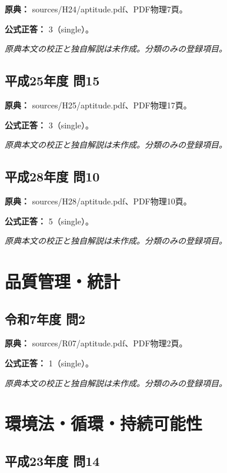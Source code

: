 \noindent\textbf{原典：} sources/H24/aptitude.pdf、PDF物理7頁。

\textbf{公式正答：} 3（single）。

\par\textit{原典本文の校正と独自解説は未作成。分類のみの登録項目。}

\subsection{平成25年度 問15}
\label{q:h25-reg-apt-15}

\noindent\textbf{原典：} sources/H25/aptitude.pdf、PDF物理17頁。

\textbf{公式正答：} 3（single）。

\par\textit{原典本文の校正と独自解説は未作成。分類のみの登録項目。}

\subsection{平成28年度 問10}
\label{q:h28-reg-apt-10}

\noindent\textbf{原典：} sources/H28/aptitude.pdf、PDF物理10頁。

\textbf{公式正答：} 5（single）。

\par\textit{原典本文の校正と独自解説は未作成。分類のみの登録項目。}

\section{品質管理・統計}

\subsection{令和7年度 問2}
\label{q:r07-reg-apt-02}

\noindent\textbf{原典：} sources/R07/aptitude.pdf、PDF物理2頁。

\textbf{公式正答：} 1（single）。

\par\textit{原典本文の校正と独自解説は未作成。分類のみの登録項目。}

\section{環境法・循環・持続可能性}

\subsection{平成23年度 問14}
\label{q:h23-reg-apt-14}

